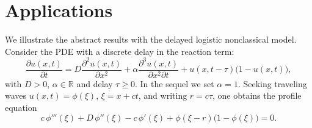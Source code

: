 \documentclass[12pt,letterpaper]{amsart}
\theoremstyle{definition}
\theoremstyle{remark}
\newtheorem{remark}[theorem]{{\bf Remark}}
\numberwithin{equation}{section}
\begin{document}
%


























 \section{Applications}\label{applications}
 
 We illustrate the abstract results with the delayed logistic nonclassical model.
 Consider the PDE with a discrete delay in the reaction term:
 \begin{equation}\label{appPDE}
 	\frac{\partial u(x,t)}{\partial t}
 	= D\frac{\partial^2 u(x,t)}{\partial x^2}
 	+ \alpha\frac{\partial^3 u(x,t)}{\partial x^2\partial t}
 	+ u(x,t-\tau)\bigl(1-u(x,t)\bigr),
 \end{equation}
 with $D>0$, $\alpha\in\mathbb R$ and delay $\tau\ge0$.  In the sequel we set $\alpha=1$.
 Seeking traveling waves $u(x,t)=\phi(\xi)$, $\xi=x+ct$, and writing $r=c\tau$, one obtains the profile equation
 \begin{equation}\label{appODE}
 	c\,\phi'''(\xi) + D\,\phi''(\xi) - c\,\phi'(\xi) + \phi(\xi-r)\bigl(1-\phi(\xi)\bigr)=0.
 \end{equation}
 
\end{document}

